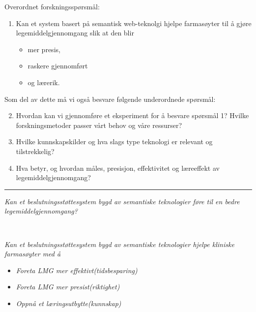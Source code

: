 Overordnet forskningsspørsmål:

\begin{enumerate}
    \item Kan et system  basert på semantisk web-teknolgi hjelpe farmasøyter til å gjøre legemiddelgjennomgang slik at den blir 
    \begin{itemize}
        \item mer presis,
        \item raskere gjennomført
        \item og lærerik.
    \end{itemize}
\end{enumerate}

Som del av dette må vi også besvare følgende underordnede spørsmål:
\begin{enumerate}
\setcounter{enumi}{1}
\item Hvordan kan vi gjennomføre et eksperiment for å besvare spørsmål 1? Hvilke forskningsmetoder passer vårt behov og våre ressurser?
\item Hvilke kunnskapskilder og hva slags type teknologi er relevant og tilstrekkelig?
\item Hva betyr, og hvordan måles, presisjon, effektivitet og læreeffekt av legemiddelgjennomgang?
\end{enumerate}

\hrule{\columnwidth}

\hfill\begin{minipage}{\dimexpr\textwidth-3cm}
\textit{Kan et beslutningsstøttesystem bygd av  semantiske teknologier føre til en bedre legemiddelgjennomgang?}
\end{minipage} \\



\hfill\begin{minipage}{\dimexpr\textwidth-3cm}
\textit{Kan et beslutningsstøttesystem bygd av semantiske teknologier hjelpe kliniske farmasøyter med å }
\begin{itemize}
\item \textit{Foreta LMG mer effektivt(tidsbesparing)}
\item \textit{Foreta LMG mer presist(riktighet)}
\item \textit{Oppnå et læringsutbytte(kunnskap)}
\end{itemize}
\end{minipage}

